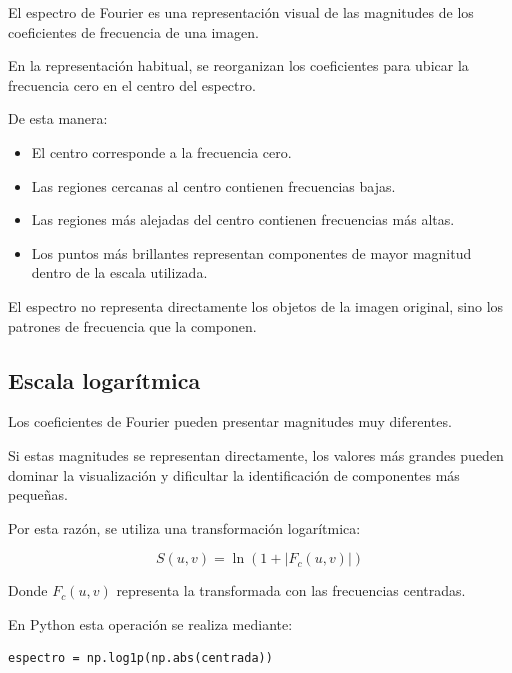 \documentclass[11pt,letterpaper]{article}
\begin{document}
El espectro de Fourier es una representación
visual de las magnitudes de los coeficientes
de frecuencia de una imagen.

En la representación habitual, se reorganizan
los coeficientes para ubicar la frecuencia
cero en el centro del espectro.

De esta manera:

\begin{itemize}

    \item El centro corresponde a la frecuencia cero.

    \item Las regiones cercanas al centro contienen
    frecuencias bajas.

    \item Las regiones más alejadas del centro
    contienen frecuencias más altas.

    \item Los puntos más brillantes representan
    componentes de mayor magnitud dentro
    de la escala utilizada.

\end{itemize}

El espectro no representa directamente los
objetos de la imagen original, sino los
patrones de frecuencia que la componen.

\subsection{Escala logarítmica}

Los coeficientes de Fourier pueden presentar
magnitudes muy diferentes.

Si estas magnitudes se representan directamente,
los valores más grandes pueden dominar
la visualización y dificultar la identificación
de componentes más pequeñas.

Por esta razón, se utiliza una transformación
logarítmica:

\begin{equation}
S(u,v)=
\ln\left(1+|F_c(u,v)|\right)
\end{equation}

Donde $F_c(u,v)$ representa la transformada
con las frecuencias centradas.

En Python esta operación se realiza mediante:

\begin{lstlisting}
espectro = np.log1p(np.abs(centrada))
\end{lstlisting}
\end{document}
